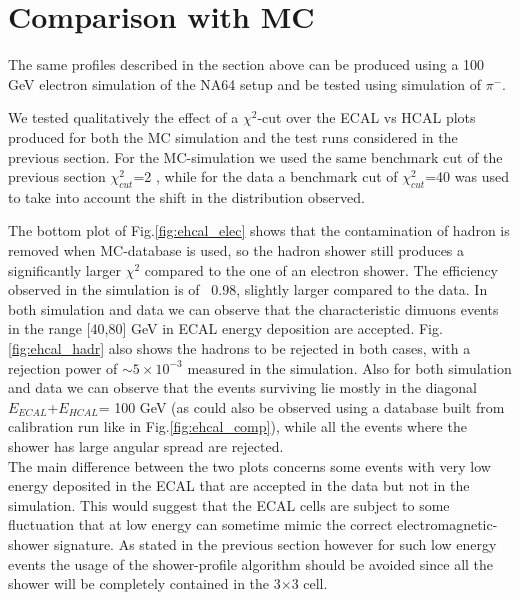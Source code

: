 \iffalse

\section{Comparison with MC}
\label{ch3:sec:mc}
The same profiles described in the section above can be produced using
a 100 GeV electron simulation of the NA64 setup\cite{na64-simulation} and be tested using simulation of $\pi^-$.

We tested qualitatively the effect of a $\chi^{2}$-cut over the
ECAL vs HCAL plots produced for both the MC simulation
and the test runs considered in the previous section. For the
MC-simulation we used the same benchmark cut of the previous section
$\chi^2_{cut}$=2 , while for the data a benchmark cut of
$\chi^2_{cut}$=40 was used to take into account the shift in the
distribution observed.

The bottom plot of Fig.\ref{fig:ehcal_elec} shows that the
contamination of hadron is removed when MC-database is used, so
the hadron shower still produces a significantly larger $\chi^{2}$
compared to the one of an electron shower. The efficiency
observed in the simulation is of ~0.98, slightly larger compared to the data. 
In both simulation and data we can observe that the characteristic
dimuons events in the range [40,80] GeV in ECAL energy
deposition are accepted.
Fig.\ref{fig:ehcal_hadr} also shows the hadrons to be rejected in both
cases, with a rejection power of $\sim 5\times 10^{-3}$ measured in the
simulation. Also for both simulation and data we can observe that the
events surviving lie mostly in the diagonal $E_{ECAL}$+$E_{HCAL}$= 100
GeV (as could also be observed using a database built from calibration run like in Fig.\ref{fig:ehcal_comp}), while all the events where the shower has large angular spread are rejected.
\\
The main difference between the two plots concerns some events with very low energy deposited in the ECAL that are accepted in the data but not in the simulation. This would suggest that the ECAL cells are subject to some fluctuation that at low energy can sometime mimic the correct electromagnetic-shower signature. As stated in the previous section however for such low energy events the usage of the shower-profile algorithm should be avoided since all the shower will be completely contained in the 3$\times$3 cell.\\


